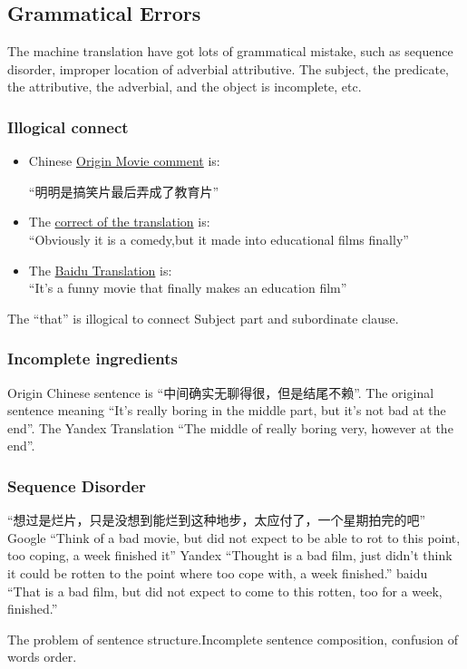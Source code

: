 \documentclass[conference]{IEEEtran}
\begin{document}
\begin{CJK*}{UTF8}{gbsn}
\subsection{Grammatical Errors}
The machine translation have got lots of grammatical mistake, such as sequence
disorder, improper location of adverbial attributive. The subject, the
predicate, the attributive, the adverbial, and the object is incomplete, etc.
\subsubsection{Illogical connect}
\begin{itemize}
\item Chinese \underline{Origin Movie comment} is:
  \begin{center}
    ``明明是搞笑片最后弄成了教育片''
  \end{center}
\item The \underline{correct of the translation} is:\\
  ``Obviously it is a comedy,but it made into educational films finally''
\item The \underline{Baidu Translation} is:\\
  ``It's a funny movie that finally makes an education film''
\end{itemize}
The ``that'' is illogical to connect Subject part and subordinate clause.
\subsubsection{Incomplete ingredients}
Origin Chinese sentence is ``中间确实无聊得很，但是结尾不赖''. The original
sentence meaning ``It's really boring in the middle part, but it's not bad at
the end''. The Yandex Translation ``The middle of really boring very, however at the end''.
\subsubsection{Sequence Disorder}
``想过是烂片，只是没想到能烂到这种地步，太应付了，一个星期拍完的吧''
Google
``Think of a bad movie, but did not expect to be able to rot to this point, too
coping, a week finished it''
Yandex
``Thought is a bad film, just didn't think it could be rotten to the point where
too cope with, a week finished.''
baidu
``That is a bad film, but did not expect to come to this rotten, too for a week, finished.''


The problem of sentence structure.Incomplete sentence composition, confusion of
words order.


\end{CJK*}
\end{document}
